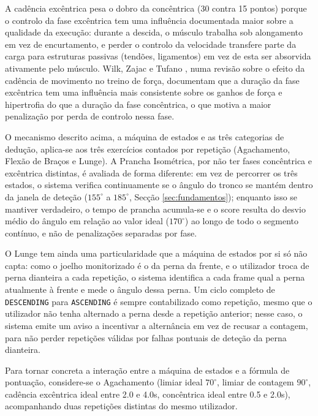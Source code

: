 A cadência excêntrica pesa o dobro da concêntrica (30 contra 15 pontos) porque o controlo da fase excêntrica tem uma influência documentada maior sobre a qualidade da execução: durante a descida, o músculo trabalha sob alongamento em vez de encurtamento, e perder o controlo da velocidade transfere parte da carga para estruturas passivas (tendões, ligamentos) em vez de esta ser absorvida ativamente pelo músculo. Wilk, Zajac e Tufano \cite{Wilk_MovementTempo_2021}, numa revisão sobre o efeito da cadência de movimento no treino de força, documentam que a duração da fase excêntrica tem uma influência mais consistente sobre os ganhos de força e hipertrofia do que a duração da fase concêntrica, o que motiva a maior penalização por perda de controlo nessa fase.

O mecanismo descrito acima, a máquina de estados e as três categorias de dedução, aplica-se aos três exercícios contados por repetição (Agachamento, Flexão de Braços e Lunge). A Prancha Isométrica, por não ter fases concêntrica e excêntrica distintas, é avaliada de forma diferente: em vez de percorrer os três estados, o sistema verifica continuamente se o ângulo do tronco se mantém dentro da janela de deteção ($155^\circ$ a $185^\circ$, Secção \ref{sec:fundamentos}); enquanto isso se mantiver verdadeiro, o tempo de prancha acumula-se e o score resulta do desvio médio do ângulo em relação ao valor ideal ($170^\circ$) ao longo de todo o segmento contínuo, e não de penalizações separadas por fase.

O Lunge tem ainda uma particularidade que a máquina de estados por si só não capta: como o joelho monitorizado é o da perna da frente, e o utilizador troca de perna dianteira a cada repetição, o sistema identifica a cada frame qual a perna atualmente à frente e mede o ângulo dessa perna. Um ciclo completo de \texttt{DESCENDING} para \texttt{ASCENDING} é sempre contabilizado como repetição, mesmo que o utilizador não tenha alternado a perna desde a repetição anterior; nesse caso, o sistema emite um aviso a incentivar a alternância em vez de recusar a contagem, para não perder repetições válidas por falhas pontuais de deteção da perna dianteira.

Para tornar concreta a interação entre a máquina de estados e a fórmula de pontuação, considere-se o Agachamento (limiar ideal $70^\circ$, limiar de contagem $90^\circ$, cadência excêntrica ideal entre 2.0 e 4.0s, concêntrica ideal entre 0.5 e 2.0s), acompanhando duas repetições distintas do mesmo utilizador.

